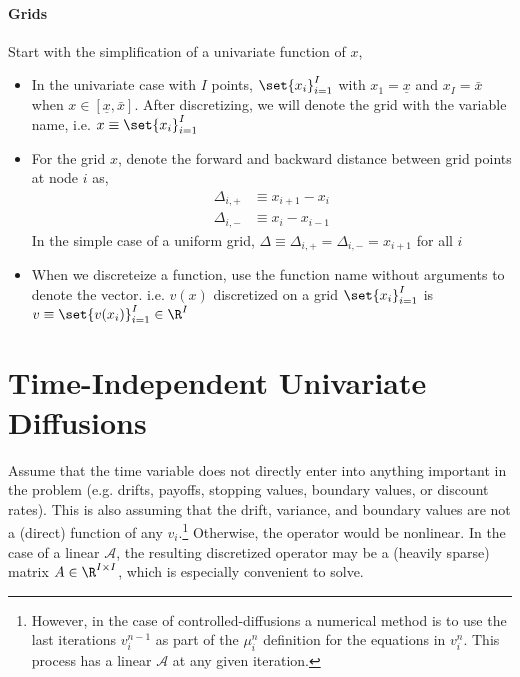 \documentclass[11pt]{etk-article}
\begin{document}
\paragraph{Grids} Start with the simplification of a univariate function of $x$,
\begin{itemize}
	\item In the univariate case with $I$ points, $\set{x_i}_{i=1}^I$ with $x_1 = \underline{x}$ and $x_I = \bar{x}$ when $x \in [\underline{x}, \bar{x}]$.  After discretizing, we will denote the grid with the variable name, i.e. $x \equiv \set{x_i}_{i=1}^I$
\item For the grid $x$, denote the forward and backward distance between grid points at node $i$ as,
\begin{align}
	\Delta_{i,+} &\equiv x_{i+1} - x_i\label{eq:Delta-i-plus}\\
	\Delta_{i,-} &\equiv x_i - x_{i-1}\label{eq:Delta-i-minus}	
\end{align}
In the simple case of a uniform grid, $\Delta \equiv \Delta_{i,+} = \Delta_{i,-} = x_{i+1}$ for all $i$
\item When we discreteize a function, use the function name without arguments to denote the vector.  i.e. $v(x)$ discretized on a grid $\set{x_i}_{i=1}^{I}$ is $v \equiv \set{v(x_i)}_{i=1}^I \in \R^I$
\end{itemize}

\section{Time-Independent Univariate Diffusions}\label{sec:time-independent-univariate-diffusion}
Assume that the time variable does not directly enter into anything important in the problem (e.g. drifts, payoffs, stopping values, boundary values, or discount rates).  This is also assuming that the drift, variance, and boundary values are not a (direct) function of any $v_i$.\footnote{However, in the case of controlled-diffusions a numerical method is to use the last iterations $v^{n-1}_i$ as part of the $\mu^n_i$ definition for the equations in $v^n_i$.  This process has a linear $\mathcal{A}$ at any given iteration.}  Otherwise, the operator would be nonlinear.  In the case of a linear $\mathcal{A}$, the resulting discretized operator may be a (heavily sparse) matrix $A \in \R^{I \times I}$, which is especially convenient to solve.
\end{document}
